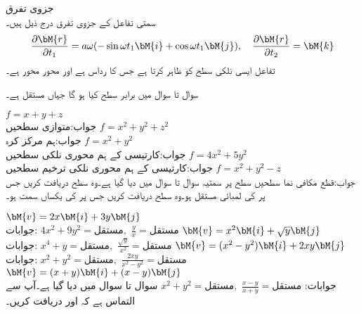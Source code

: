 \quad جزوی تفرق\\
سمتی تفاعل  کے جزوی تفرق درج ذیل ہیں۔ 
\begin{align*}
\frac{\partial \bM{r}}{\partial t_1}=a\omega (-\sin \omega t_1\bM{i}+\cos \omega t_1\bM{j}),\quad \frac{\partial \bM{r}}{\partial t_2}=\bM{k}
\end{align*}
تفاعل  ایسی نلکی سطح کو ظاہر کرتا ہے جس کا رداس  ہے  اور محور  محور ہے۔ 


سوال  تا سوال  میں برابر سطح  کیا ہو گا جہاں  مستقل ہے۔

\quad
$f=x+y+z$\\
جواب:متوازی سطحیں
\quad
$f=x^2+y^2+z^2$\\
جواب:ہم مرکز کرہ
\quad
$f=x^2+y^2$\\
جواب:کارتیسی   کے ہم محوری نلکی سطحیں
\quad
$f=4x^2+5y^2$\\
جواب:کارتیسی   کے ہم محوری نلکی ترخیم سطحیں
\quad
$f=x^2+y^2-z$\\
جواب:قطع مکافی نما سطحیں
 سطح پر سمتیہ  سوال  تا سوال  میں دیا گیا ہے۔وہ سطح دریافت کریں جس پر  کی لمبائی مستقل ہو۔وہ سطح دریافت کریں جس پر   کی یکساں سمت ہو۔ 

\quad 
$\bM{v}=2x\bM{i}+3y\bM{j}$\\
جوابات:
$4x^2+9y^2=\text{مستقل},\,\, \tfrac{y}{x}=\text{مستقل}$
\quad 
$\bM{v}=x^2\bM{i}+\sqrt{y}\bM{j}$\\
جوابات:
$x^4+y=\text{مستقل},\,\, \tfrac{\sqrt{y}}{x^2}=\text{مستقل}$
\quad 
$\bM{v}=(x^2-y^2)\bM{i}+2xy\bM{j}$\\
جوابات:
$x^2+y^2=\text{مستقل},\,\, \tfrac{2xy}{x^2-y^2}=\text{مستقل}$
\quad 
$\bM{v}=(x+y)\bM{i}+(x-y)\bM{j}$\\
جوابات:
$x^2+y^2=\text{مستقل},\,\, \tfrac{x-y}{x+y}=\text{مستقل}$
سوال  تا سوال  میں  دیا گیا ہے۔آپ سے التماس ہے کہ  اور   دریافت کریں۔

